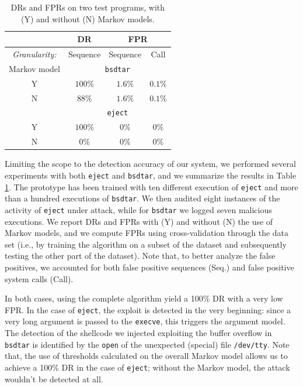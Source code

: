 \begin{table}[t]
  \centering
  \begin{tabular}{cccc}
    \toprule
    & \multicolumn{1}{c}{DR} & \multicolumn{2}{c}{FPR} \\
    \midrule
    \emph{Granularity:} & Sequence & Sequence & Call \\
    \midrule
    Markov model &\multicolumn{3}{c}{\texttt{bsdtar}}\\
    \cmidrule{2-4}
    Y & $100\%$ & $1.6\%$ & $0.1\%$ \\
    N & $88\%$ & $1.6\%$ & $0.1\%$ \\
    \midrule
    &\multicolumn{3}{c}{\texttt{eject}}\\
    \cmidrule{2-4}
    Y & $100\%$ & $0\%$ & $0\%$ \\
    N & $0\%$ & $0\%$ & $0\%$ \\
    \bottomrule
  \end{tabular}
  \caption{\acp{DR} and \acp{FPR} on two test programs, with (Y) and without (N) Markov models.}
  \label{tab:res-sum}
\end{table}

Limiting the scope to the detection accuracy of our system, we
performed several experiments with both \texttt{eject} and
\texttt{bsdtar}, and we summarize the results in Table
\ref{tab:res-sum}. The prototype has been trained with ten different
execution of \texttt{eject} and more than a hundred executions of
\texttt{bsdtar}. We then audited eight instances of the activity of
\texttt{eject} under attack, while for \texttt{bsdtar} we logged seven
malicious executions. We report \acp{DR} and
\acp{FPR} with (Y) and without (N) the use of Markov
models, and we compute \acp{FPR} using cross-validation
through the data set (i.e., by training the algorithm on a subset of
the dataset and subsequently testing the other part of the
dataset). Note that, to better analyze the false positives, we
accounted for both false positive sequences (Seq.) and false positive
system calls (Call).

In both cases, using the complete algorithm yield a 100\% \ac{DR} with
a very low \ac{FPR}. In the case of \texttt{eject}, the exploit is
detected in the very beginning: since a very long argument is passed
to the \texttt{execve}, this triggers the argument model. The
detection of the shellcode we injected exploiting the buffer overflow
in \texttt{bsdtar} is identified by the \texttt{open} of the
unexpected (special) file \texttt{/dev/tty}. Note that, the use of
thresholds calculated on the overall Markov model allows us to achieve
a 100\% \ac{DR} in the case of \texttt{eject}; without the Markov
model, the attack wouldn't be detected at all.

